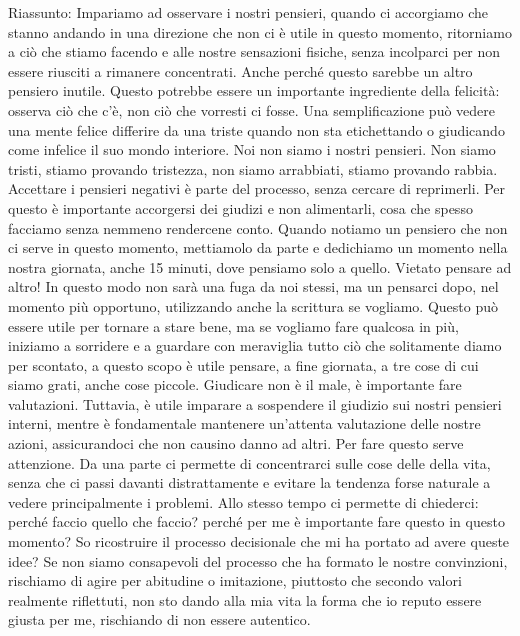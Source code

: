 \documentclass[12pt]{book} %
\begin{document}
\begin{mdframed}[linewidth=1pt]
Riassunto: Impariamo ad osservare i nostri pensieri, quando ci accorgiamo che stanno andando in una direzione che non ci è utile in questo momento, ritorniamo a ciò che stiamo facendo e alle nostre sensazioni fisiche, senza incolparci per non essere riusciti a rimanere concentrati. Anche perché questo sarebbe un altro pensiero inutile. Questo potrebbe essere un importante ingrediente della felicità: osserva ciò che c'è, non ciò che vorresti ci fosse. Una semplificazione può vedere una mente felice differire da una triste quando non sta etichettando o giudicando come infelice il suo mondo interiore. Noi non siamo i nostri pensieri. Non siamo tristi, stiamo provando tristezza, non siamo arrabbiati, stiamo provando rabbia. Accettare i pensieri negativi è parte del processo, senza cercare di reprimerli. Per questo è importante accorgersi dei giudizi e non alimentarli, cosa che spesso facciamo senza nemmeno rendercene conto.
Quando notiamo un pensiero che non ci serve in questo momento, mettiamolo da parte e dedichiamo un momento nella nostra giornata, anche 15 minuti, dove pensiamo solo a quello. Vietato pensare ad altro! In questo modo non sarà una fuga da noi stessi, ma un pensarci dopo, nel momento più opportuno, utilizzando anche la scrittura se vogliamo. Questo può essere utile per tornare a stare bene, ma se vogliamo fare qualcosa in più, iniziamo a sorridere e a guardare con meraviglia tutto ciò che solitamente diamo per scontato, a questo scopo è utile pensare, a fine giornata, a tre cose di cui siamo grati, anche cose piccole.
Giudicare non è il male, è importante fare valutazioni. Tuttavia, è utile imparare a sospendere il giudizio sui nostri pensieri interni, mentre è fondamentale mantenere un'attenta valutazione delle nostre azioni, assicurandoci che non causino danno ad altri.
Per fare questo serve attenzione. Da una parte ci permette di concentrarci sulle cose delle della vita, senza che ci passi davanti distrattamente e evitare la tendenza forse naturale a vedere principalmente i problemi. Allo stesso tempo ci permette di chiederci: perché faccio quello che faccio? perché per me è importante fare questo in questo momento? So ricostruire il processo decisionale che mi ha portato ad avere queste idee? Se non siamo consapevoli del processo che ha formato le nostre convinzioni, rischiamo di agire per abitudine o imitazione, piuttosto che secondo valori realmente riflettuti, non sto dando alla mia vita la forma che io reputo essere giusta per me, rischiando di non essere autentico.


\end{mdframed}
\end{document}
